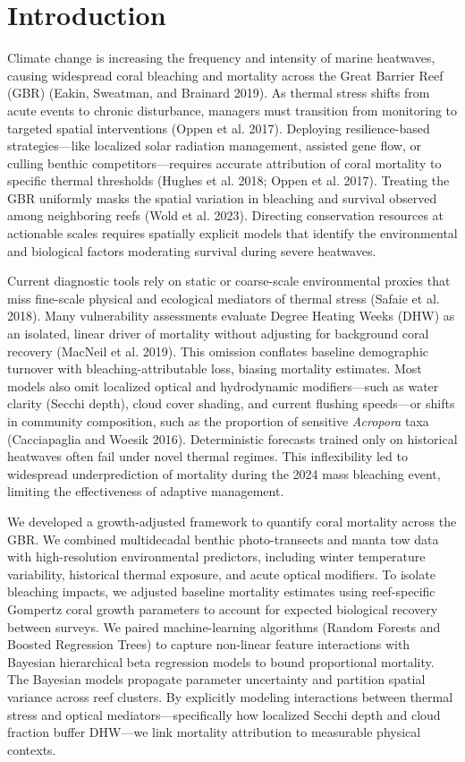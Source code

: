 \documentclass[
  letterpaper,
  DIV=11,
  numbers=noendperiod]{scrartcl}
\begin{document}
\section{Introduction}\label{introduction}

Climate change is increasing the frequency and intensity of marine
heatwaves, causing widespread coral bleaching and mortality across the
Great Barrier Reef (GBR) (Eakin, Sweatman, and Brainard 2019). As
thermal stress shifts from acute events to chronic disturbance, managers
must transition from monitoring to targeted spatial interventions (Oppen
et al. 2017). Deploying resilience-based strategies---like localized
solar radiation management, assisted gene flow, or culling benthic
competitors---requires accurate attribution of coral mortality to
specific thermal thresholds (Hughes et al. 2018; Oppen et al. 2017).
Treating the GBR uniformly masks the spatial variation in bleaching and
survival observed among neighboring reefs (Wold et al. 2023). Directing
conservation resources at actionable scales requires spatially explicit
models that identify the environmental and biological factors moderating
survival during severe heatwaves.

Current diagnostic tools rely on static or coarse-scale environmental
proxies that miss fine-scale physical and ecological mediators of
thermal stress (Safaie et al. 2018). Many vulnerability assessments
evaluate Degree Heating Weeks (DHW) as an isolated, linear driver of
mortality without adjusting for background coral recovery (MacNeil et
al. 2019). This omission conflates baseline demographic turnover with
bleaching-attributable loss, biasing mortality estimates. Most models
also omit localized optical and hydrodynamic modifiers---such as water
clarity (Secchi depth), cloud cover shading, and current flushing
speeds---or shifts in community composition, such as the proportion of
sensitive \emph{Acropora} taxa (Cacciapaglia and Woesik 2016).
Deterministic forecasts trained only on historical heatwaves often fail
under novel thermal regimes. This inflexibility led to widespread
underprediction of mortality during the 2024 mass bleaching event,
limiting the effectiveness of adaptive management.

We developed a growth-adjusted framework to quantify coral mortality
across the GBR. We combined multidecadal benthic photo-transects and
manta tow data with high-resolution environmental predictors, including
winter temperature variability, historical thermal exposure, and acute
optical modifiers. To isolate bleaching impacts, we adjusted baseline
mortality estimates using reef-specific Gompertz coral growth parameters
to account for expected biological recovery between surveys. We paired
machine-learning algorithms (Random Forests and Boosted Regression
Trees) to capture non-linear feature interactions with Bayesian
hierarchical beta regression models to bound proportional mortality. The
Bayesian models propagate parameter uncertainty and partition spatial
variance across reef clusters. By explicitly modeling interactions
between thermal stress and optical mediators---specifically how
localized Secchi depth and cloud fraction buffer DHW---we link mortality
attribution to measurable physical contexts.
\end{document}
